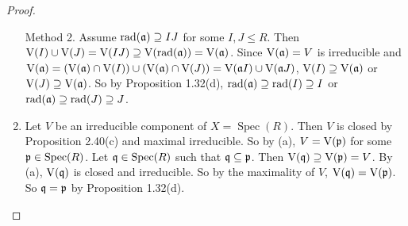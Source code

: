 \begin{proof}
\begin{enumerate}
        Method 2. Assume $\operatorname{rad}(\mathfrak{a}) \supseteq IJ$ for some $I,J \leq R$. Then $\operatorname{V}(I) \cup \operatorname{V}(J) = \operatorname{V}(IJ) \supseteq \operatorname{V}(\operatorname{rad}(\mathfrak{a})) = \operatorname{V}(\mathfrak{a})$. Since $\operatorname{V}(\mathfrak{a}) = V$ is irreducible and $\operatorname{V}(\mathfrak{a}) = (\operatorname{V}(\mathfrak{a}) \cap \operatorname{V}(I)) \cup (\operatorname{V}(\mathfrak{a}) \cap \operatorname{V}(J)) = \operatorname{V}(\mathfrak{a} I) \cup \operatorname{V}(\mathfrak{a} J)$, $\operatorname{V}(I) \supseteq \operatorname{V}(\mathfrak{a})$ or $\operatorname{V}(J) \supseteq \operatorname{V}(\mathfrak{a})$. So by Proposition 1.32(d), $\operatorname{rad}(\mathfrak{a}) \supseteq \operatorname{rad}(I) \supseteq I$ or $\operatorname{rad}(\mathfrak{a}) \supseteq \operatorname{rad}(J) \supseteq J$.
    \item Let $V$ be an irreducible component of $X = \operatorname{Spec}(R)$. Then $V$ is closed by Proposition 2.40(c) and maximal irreducible. So by (a), $V = \operatorname{V}(\mathfrak{p})$ for some $\mathfrak{p} \in \operatorname{Spec}(R)$. Let $\mathfrak{q} \in \operatorname{Spec}(R)$ such that $\mathfrak{q} \subseteq \mathfrak{p}$. Then $\operatorname{V}(\mathfrak{q}) \supseteq \operatorname{V}(\mathfrak{p}) = V$. By (a), $\operatorname{V}(\mathfrak{q})$ is closed and irreducible. So by the maximality of $V$, $\operatorname{V}(\mathfrak{q}) = \operatorname{V}(\mathfrak{p})$. So $\mathfrak{q} = \mathfrak{p}$ by Proposition 1.32(d). \qedhere
    \end{enumerate}
\end{proof}

